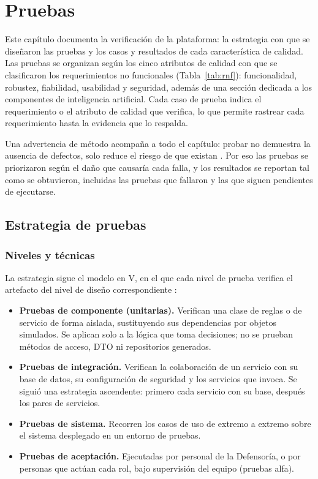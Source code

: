 \chapter{Pruebas}
	\label{cap:pruebas}
	Este capítulo documenta la verificación de la plataforma: la estrategia con que se diseñaron las
	pruebas y los casos y resultados de cada característica de calidad. Las pruebas se organizan según los cinco atributos de calidad con que se
	clasificaron los requerimientos no funcionales (Tabla~\ref{tab:rnf}): funcionalidad, robustez,
	fiabilidad, usabilidad y seguridad, además de una sección dedicada a los componentes de inteligencia
	artificial. Cada caso de prueba indica el requerimiento o el atributo de calidad que verifica, lo que permite rastrear cada requerimiento
	hasta la evidencia que lo respalda.

	Una advertencia de método acompaña a todo el capítulo: probar no demuestra la ausencia de defectos,
	solo reduce el riesgo de que existan \cite{myers_testing}. Por eso las pruebas se priorizaron según
	el daño que causaría cada falla, y los resultados se reportan tal como se obtuvieron, incluidas las
	pruebas que fallaron y las que siguen pendientes de ejecutarse.

	\section{Estrategia de pruebas}
	\label{sec:estrategia_pruebas}
	\subsection{Niveles y técnicas}
	La estrategia sigue el modelo en V, en el que cada nivel de prueba verifica el artefacto del nivel de
	diseño correspondiente \cite{istqb_foundation}:

	\begin{itemize}
		\item \textbf{Pruebas de componente (unitarias).} Verifican una clase de reglas o de servicio de
		forma aislada, sustituyendo sus dependencias por objetos simulados. Se aplican solo a la lógica que
		toma decisiones; no se prueban métodos de acceso, DTO ni repositorios generados.
		\item \textbf{Pruebas de integración.} Verifican la colaboración de un servicio con su base de
		datos, su configuración de seguridad y los servicios que invoca. Se siguió una estrategia
		ascendente: primero cada servicio con su base, después los pares de servicios.
		\item \textbf{Pruebas de sistema.} Recorren los casos de uso de extremo a extremo sobre el sistema
		desplegado en un entorno de pruebas.
		\item \textbf{Pruebas de aceptación.} Ejecutadas por personal de la Defensoría, o por personas que
		actúan cada rol, bajo supervisión del equipo (pruebas alfa).
	\end{itemize}

